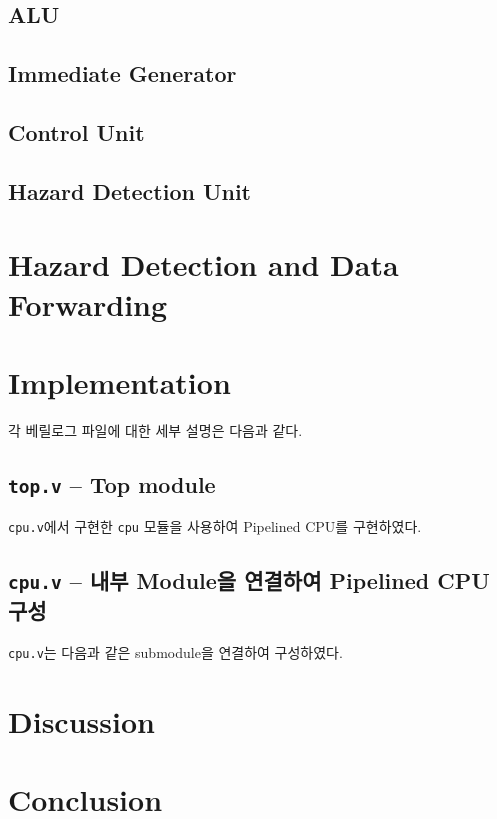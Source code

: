 \documentclass{scrartcl}
\begin{document}
\subsection{ALU}

\subsection{Immediate Generator}

\subsection{Control Unit}

\subsection{Hazard Detection Unit}

\section{Hazard Detection and Data Forwarding}

\section{Implementation}
각 베릴로그 파일에 대한 세부 설명은 다음과 같다.

\subsection{\texttt{top.v} -- Top module}
\texttt{cpu.v}에서 구현한 \texttt{cpu} 모듈을 사용하여 Pipelined CPU를 구현하였다.

\subsection{\texttt{cpu.v} -- 내부 Module을 연결하여 Pipelined CPU 구성}
\texttt{cpu.v}는 다음과 같은 submodule을 연결하여 구성하였다.
\begin{itemize}
\end{itemize}

\section{Discussion}

\section{Conclusion}
\end{document}
